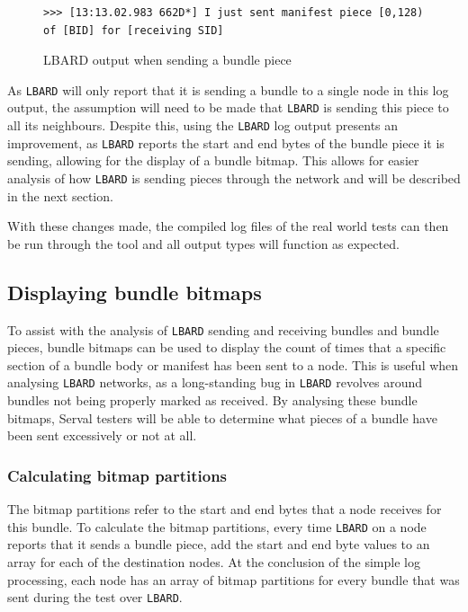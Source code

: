 \begin{figure}
    \begin{centering}
\begin{lstlisting}[basicstyle=\small, breaklines]
    >>> [13:13.02.983 662D*] I just sent manifest piece [0,128) of [BID] for [receiving SID]
\end{lstlisting}
        \caption{LBARD output when sending a bundle piece}
        \label{fig:chapter6RLBARDSent}
    \end{centering}
\end{figure}

As \texttt{LBARD} will only report that it is sending a bundle to a single node in this log output, the assumption will need to be made that \texttt{LBARD} is sending this piece to all its neighbours.
Despite this, using the \texttt{LBARD} log output presents an improvement, as \texttt{LBARD} reports the start and end bytes of the bundle piece it is sending, allowing for the display of a bundle bitmap.
This allows for easier analysis of how \texttt{LBARD} is sending pieces through the network and will be described in the next section.

With these changes made, the compiled log files of the real world tests can then be run through the tool and all output types will function as expected.

\subsection{Displaying bundle bitmaps}
To assist with the analysis of \texttt{LBARD} sending and receiving bundles and bundle pieces, bundle bitmaps can be used to display the count of times that a specific section of a bundle body or manifest has been sent to a node.
This is useful when analysing \texttt{LBARD} networks, as a long-standing bug in \texttt{LBARD} revolves around bundles not being properly marked as received.
By analysing these bundle bitmaps, Serval testers will be able to determine what pieces of a bundle have been sent excessively or not at all.

\subsubsection{Calculating bitmap partitions}
The bitmap partitions refer to the start and end bytes that a node receives for this bundle.
To calculate the bitmap partitions, every time \texttt{LBARD} on a node reports that it sends a bundle piece, add the start and end byte values to an array for each of the destination nodes.
At the conclusion of the simple log processing, each node has an array of bitmap partitions for every bundle that was sent during the test over \texttt{LBARD}.

